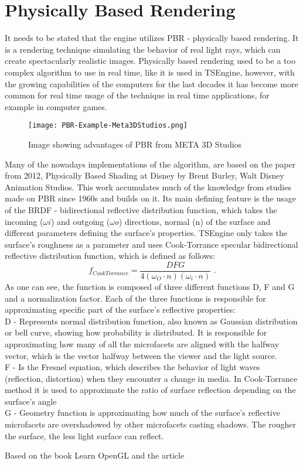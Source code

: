 \newpage
\section{Physically Based Rendering}
It needs to be stated that the engine utilizes PBR - physically based rendering. It is a rendering technique simulating the behavior of real light rays, which can create spectacularly realistic images. Physically based rendering used to be a too complex algorithm to use in real time, like it is used in TSEngine, however, with the growing capabilities of the computers for the last decades it has become more common for real time usage of the technique in real time applications, for example in computer games.
\begin{figure}[H]
    \texttt{[image: PBR-Example-Meta3DStudios.png]}
    \caption{Image showing advantages of PBR from META 3D Studios \cite{pbrExample} }
\end{figure}
Many of the nowadays implementations of the algorithm, are based on the paper from 2012, Physically Based Shading at Disney by Brent Burley, Walt Disney Animation Studios. This work accumulates much of the knowledge from studies made on PBR since 1960s and builds on it. Its main defining feature is the usage of the BRDF - bidirectional reflective distribution function, which takes the incoming ($\omega i$) and outgoing ($\omega o$) directions, normal (n) of the surface and different parameters defining the surface's properties. TSEngine only takes the surface's roughness as a parameter and uses Cook-Torrance specular bidirectional reflective distribution function, which is defined as follows:
\begin{equation}
f_{CookTorrance}=\frac{DFG}{4(\omega_{O} \cdot n)(\omega_{i} \cdot n)}
\text{ .}
\label{EquationCookTorrance}
\end{equation}
As one can see, the function is composed of three different functions D, F and G and a normalization factor. Each of the three functions is responsible for approximating specific part of the surface's reflective properties:\\
D - Represents normal distribution function, also known as Gaussian distribution or bell curve, showing how probability is distributed. It is responsible for approximating how many of all the microfacets are aligned with the halfway vector, which is the vector halfway between the viewer and the light source. \\
F - Is the Fresnel equation, which describes the behavior of light waves (reflection, distortion) when they encounter a change in media. In Cook-Torrance method it is used to approximate the ratio of surface reflection depending on the surface's angle\\ 
G - Geometry function is approximating how much of the surface's reflective microfacets are overshadowed by other microfacets casting shadows. The rougher the surface, the less light surface can reflect.

Based on the book Learn OpenGL \cite{learnopengl} and the article \cite{pbrreferences}